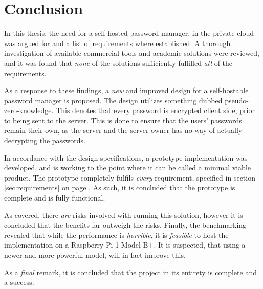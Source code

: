 \chapter{Conclusion}
	In this thesis, the need for a self-hosted password manager, in the private cloud was argued for and a list of requirements where established. A thorough investigation of available commercial tools and academic solutions were reviewed, and it was found that \emph{none} of the solutions sufficiently fulfilled \emph{all} of the requirements.

	As a response to these findings, a \emph{new} and improved design for a self-hostable password manager is proposed. The design utilizes something dubbed pseudo-zero-knowledge. This denotes that every password is encrypted client side, prior to being sent to the server. This is done to ensure that the users' passwords remain their own, as the server and the server owner has no way of actually decrypting the passwords.

	In accordance with the design specifications, a prototype implementation was developed, and is working to the point where it can be called a minimal viable product. The prototype completely fulfils \emph{every} requirement, specified in section \ref{sec:requirements} on page \pageref{sec:requirements}. As such, it is concluded that the prototype is complete and is fully functional.

	As covered, there \emph{are} risks involved with running this solution, however it is concluded that the benefits far outweigh the risks. Finally, the benchmarking revealed that while the performance is \emph{horrible}, it is \emph{feasible} to host the implementation on a Raspberry Pi 1 Model B+. It is suspected, that using a newer and more powerful model, will in fact improve this. 

	As a \emph{final} remark, it is concluded that the project in its entirety is complete and a success.